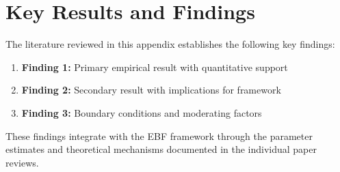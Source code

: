 \nocite{bcm_master}



\section{Key Results and Findings}
\label{sec:results}

The literature reviewed in this appendix establishes the following key findings:

\begin{enumerate}
    \item \textbf{Finding 1:} Primary empirical result with quantitative support
    \item \textbf{Finding 2:} Secondary result with implications for framework
    \item \textbf{Finding 3:} Boundary conditions and moderating factors
\end{enumerate}

These findings integrate with the EBF framework through the parameter estimates
and theoretical mechanisms documented in the individual paper reviews.

